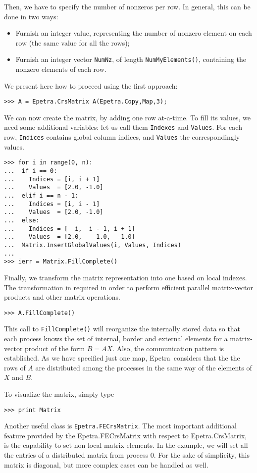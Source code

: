 \documentclass[10pt,relax]{SANDreport}
\newcommand{\epetra}{{Epetra}}
\begin{document}
Then, we have to specify the number
of nonzeros per row. In general, this can be done in two ways:
\begin{itemize}
\item Furnish an integer value, representing the number of nonzero
  element on each row (the same value for all the rows);
\item Furnish an integer vector \verb!NumNz!, of length
  \verb!NumMyElements()!, containing the nonzero elements of each row.
\end{itemize}

We present here how to proceed using the first approach:
\begin{verbatim}
>>> A = Epetra.CrsMatrix A(Epetra.Copy,Map,3);
\end{verbatim}
We can now create the matrix, by adding one row at-a-time.
To fill its values, we
need some additional variables: let us call them \verb!Indexes! and
\verb!Values!. For each row, \verb!Indices! contains global column
indices, and \verb!Values! the correspondingly values.
\begin{verbatim}
>>> for i in range(0, n):
...  if i == 0:
...    Indices = [i, i + 1]
...    Values  = [2.0, -1.0]
...  elif i == n - 1:
...    Indices = [i, i - 1]
...    Values  = [2.0, -1.0]
...  else:
...    Indices = [  i,  i - 1, i + 1]
...    Values  = [2.0,   -1.0,  -1.0]
...  Matrix.InsertGlobalValues(i, Values, Indices)
...
>>> ierr = Matrix.FillComplete()
\end{verbatim}
Finally, we
transform the matrix representation into one based on local indexes. The
transformation in required in order to perform efficient parallel
matrix-vector products and other matrix operations.
\begin{verbatim}
>>> A.FillComplete()
\end{verbatim}
This call to \verb!FillComplete()! will reorganize the internally stored
data so that each process knows the set of internal, border and external
elements for a matrix-vector product of the form $B = AX$. Also, the
communication pattern is established. As we have specified just one map,
\epetra\ considers that the the rows of $A$ are distributed among the
processes in the same way of the elements of $X$ and $B$.

To visualize the matrix, simply type
\begin{verbatim}
>>> print Matrix
\end{verbatim}

Another useful class is {\tt Epetra.FECrsMatrix}.
The most important additional feature provided by the
Epetra.FECrsMatrix with respect to Epetra.CrsMatrix, is the capability
to set non-local matrix elements. In the
example, we will set all the entries of a distributed matrix from
process 0. For the sake of simplicity, this matrix is diagonal, but more
complex cases can be handled as well.
\end{document}
